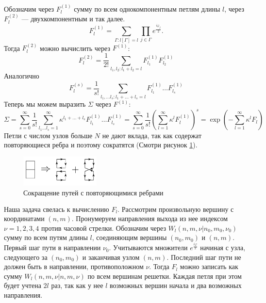 \documentclass[a4paper,12pt]{article}
\theoremstyle{definition}
\theoremstyle{definition}
\theoremstyle{definition}
\begin{document}
Обозначим через $F^{(1)}_l$ сумму по всем однокомпонентным петлям длины $l$, через $F^{(2)}_l$ --- двухкомпонентным и так далее.
\begin{equation}
  \label{eq:117}
  F^{(1)}_l=\sum_{\Gamma:l[\Gamma]=l} \prod_{j\in \Gamma} e^{\frac{i\varphi_j}{2}}.
\end{equation}
Тогда $F_l^{(2)}$ можно вычислить через $F^{(1)}$:
\begin{equation}
  \label{eq:118}
  F^{(2)}_l=\frac{1}{2!}\sum_{l_1,l_2:l_1+l_2=l} F^{(1)}_{l_1} F^{(1)}_{l_2}
\end{equation}
Аналогично
\begin{equation}
  \label{eq:119}
  F^{(s)}_l=\frac{1}{s!}\sum_{l_1,\dots l_s:l_1+\dots+l_s=l} F^{(1)}_{l_1}\dots F^{(1)}_{l_s}
\end{equation}
Теперь мы можем выразить $\Sigma$ через $F^{(1)}$:
\begin{equation}
  \label{eq:120}
  \Sigma=\sum_{s=0}^{\infty}\frac{1}{s!}\sum_{l_1\dots l_s=1}^{\infty} \kappa^{l_1+\dots+l_s}F^{(1)}_{l_1} \dots F^{(1)}_{l_s}=
  \sum_{s=0}^{\infty}\frac{1}{s!}\left(\sum_{l=1}^{\infty} \kappa^{l}F^{(1)}_{l} \right)^s =\exp\left(-\sum_{l=1}^{\infty} \kappa^l F_l\right)
\end{equation}
Петли с числом узлов больше $N$ не дают вклада, так как содержат повторяющиеся ребра и поэтому сократятся (Смотри рисунок \ref{fig:ising-2}).
\begin{figure}[h!tb]
  \centering
  \includegraphics[width=40mm]{ising2}
  \caption{Сокращение путей с повторяющимися ребрами}
  \label{fig:ising-2}
\end{figure}
Наша задача свелась к вычислению $F_l$. Рассмотрим произвольную вершину с координатами $(n,m)$. Пронумеруем направления выхода из нее индексом $\nu=1,2,3,4$ против часовой стрелки. Обозначим через $W_l (n,m,\nu|n_0,m_0,\nu_0)$ сумму по всем путям длины $l$, соединяющим вершины $(n_0,m_0)$ и $(n,m)$. Первый шаг пути в направлении $\nu_0$. Учитываются множители $e^{\frac{i\varphi}{2}}$ начиная с узла, следующего за $(n_0,m_0)$ и заканчивая узлом $(n,m)$. Последний шаг пути не должен быть в направлении, противоположном $\nu$. Тогда $F_l$ можно записать как сумму $W_l(n,m,\nu|n,m,\nu)$ по всем вершинам решетки. Каждая петля при этом будет учтена $2l$ раз, так как у нее $l$ возможных вершин начала и два возможных направления.
\end{document}
